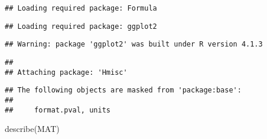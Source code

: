 \documentclass[
]{article}
\newenvironment{Shaded}{\begin{snugshade}}{\end{snugshade}}
\newcommand{\FunctionTok}[1]{\textcolor[rgb]{0.00,0.00,0.00}{#1}}
\newcommand{\NormalTok}[1]{#1}
\begin{document}
\begin{verbatim}
## Loading required package: Formula
\end{verbatim}

\begin{verbatim}
## Loading required package: ggplot2
\end{verbatim}

\begin{verbatim}
## Warning: package 'ggplot2' was built under R version 4.1.3
\end{verbatim}

\begin{verbatim}
## 
## Attaching package: 'Hmisc'
\end{verbatim}

\begin{verbatim}
## The following objects are masked from 'package:base':
## 
##     format.pval, units
\end{verbatim}

\begin{Shaded}
\begin{Highlighting}[]
\FunctionTok{describe}\NormalTok{(MAT)}
\end{Highlighting}
\end{Shaded}
\end{document}
